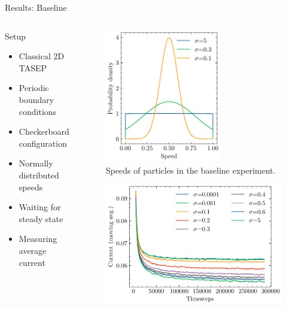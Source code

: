 \documentclass[10pt,xcolor=table, aspectratio=1610]{beamer}
\begin{document}
\begin{frame}{Results: Baseline}
  \begin{columns}
    \begin{block}{Setup}
      \begin{itemize}
        \item Classical 2D TASEP
        \item Periodic boundary conditions
        \item Checkerboard configuration
        \item<2-> Normally distributed speeds
        \item<3-> Waiting for steady state
        \item<4-> Measuring average current
      \end{itemize}
    \end{block}
    \begin{overprint}
    \begin{figure}
      \includegraphics[width=0.65\textwidth]{../Thesis/img/results/truncated_normal.pdf}
      \caption*{\hspace{0.175\textwidth} Speeds of particles in the baseline experiment.}
    \end{figure}
    \begin{figure}
      \includegraphics[width=\textwidth]{../Thesis/img/results/currents_fixed_sigma_128x32.pdf}

\end{figure}
\end{overprint}
\end{columns}
\end{frame}
\end{document}
